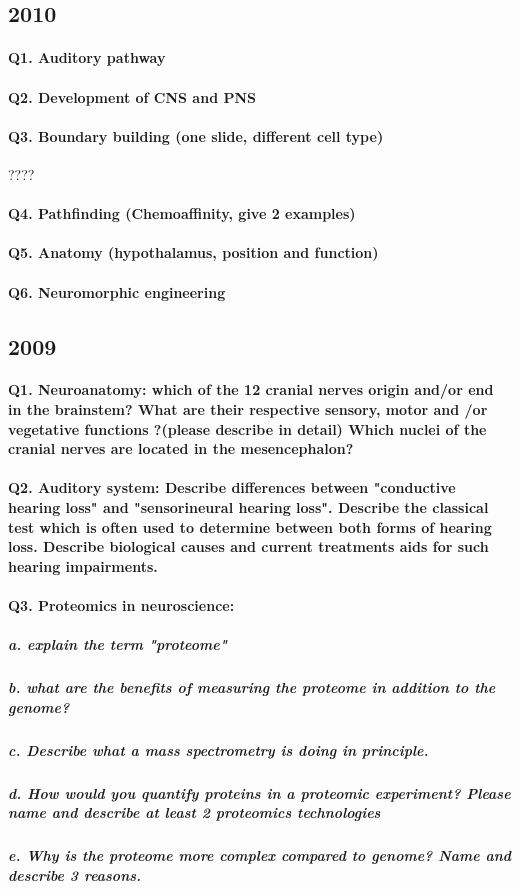 \documentclass[12pt,article,oneside,a4paper]{memoir}
\begin{document}
\subsection{2010}
\paragraph{Q1. Auditory pathway}
\paragraph{Q2. Development of CNS and PNS}
\paragraph{Q3. Boundary building (one slide, different cell type)} ????
\paragraph{Q4. Pathfinding (Chemoaffinity, give 2 examples)}
\paragraph{Q5. Anatomy (hypothalamus, position and function)}
\paragraph{Q6. Neuromorphic engineering}

\subsection{2009}
\paragraph{Q1. Neuroanatomy: which of the 12 cranial nerves origin and/or end in the brainstem? What are their respective sensory, motor and /or vegetative functions ?(please describe in detail) Which nuclei of the cranial nerves are located in the mesencephalon?}
\paragraph{Q2. Auditory system: Describe differences between "conductive hearing loss" and "sensorineural hearing loss". Describe the classical test which is often used to determine between both forms of hearing loss. Describe biological causes and current treatments aids for such hearing impairments.}

\paragraph{Q3. Proteomics in neuroscience:}
\subparagraph{a. explain the term "proteome"}
\subparagraph{b. what are the benefits of measuring the proteome in addition to the genome?}
\subparagraph{c. Describe what a mass spectrometry is doing in principle.}
\subparagraph{d. How would you quantify proteins in a proteomic experiment? Please name and describe at least 2 proteomics technologies}
\subparagraph{e. Why is the proteome more complex compared to genome? Name and describe 3 reasons.}
\end{document}
